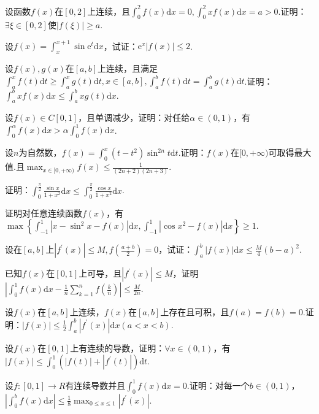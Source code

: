 \begin{xiti}
\item 设函数$f(x)$在$[0,2]$上连续，且$\int_{0}^{2} f(x) \mathrm{d} x=0, \int_{0}^{2} x f(x) \mathrm{d} x=a>0$.证明：$\exists \xi \in[0,2]$使$|f(\xi)| \geqslant a$.
\item 设$f(x)=\int_{x}^{x+1} \sin \mathrm{e}^{t} \mathrm{d} x$，试证：$\mathrm{e}^{x}|f(x)| \leqslant 2$.
\item 设$f(x),g(x)$在$[a,b]$上连续，且满足$\int_{a}^{x} f(t) \mathrm{d} t \geqslant \int_{a}^{x} g(t) \mathrm{d} t, x \in[a, b], \int_{a}^{b} f(t) \mathrm{d} t=\int_{a}^{b} g(t) \mathrm{d} t$.证明：$\int_{a}^{b} x f(x) \mathrm{d} x \leqslant \int_{a}^{b} x g(t) \mathrm{d} x$.
\item 设$f(x) \in C[0,1]$，且单调减少，证明：对任给$\alpha\in (0,1)$，有$\int_{0}^{\alpha} f(x) \mathrm{d} x>\alpha \int_{0}^{1} f(x) \mathrm{d} x$.
\item 设$n$为自然数，$f(x)=\int_{0}^{x}\left(t-t^{2}\right) \sin ^{2 n} t \mathrm{d} t$.证明：$f(x)$在$[0,+\infty)$可取得最大值.且$\max _{x \in[0,+\infty)} f(x) \leqslant \frac{1}{(2 n+2)(2 n+3)}$.
\item 证明：$\int_{0}^{\frac{\pi}{2}} \frac{\sin x}{1+x^{2}} \mathrm{d} x \leqslant \int_{0}^{\frac{\pi}{2}} \frac{\cos x}{1+x^{2}} \mathrm{d} x$.
\item 证明对任意连续函数$f(x)$，有$\max \left\{\int_{-1}^{1}\left|x-\sin ^{2} x-f(x)\right| \mathrm{d} x, \int_{-1}^{1}\left|\cos x^{2}-f(x)\right| \mathrm{d} x\right\} \geqslant 1$.
\item 设在$[a,b]$上$\left|f^{\prime}(x)\right| \leqslant M, f\left(\frac{a+b}{2}\right)=0$，试证：$\int_{a}^{b}|f(x)| \mathrm{d} x \leqslant \frac{M}{4}(b-a)^{2}$.
\item 已知$f(x)$在$[0,1]$上可导，且$\left|f^{\prime}(x)\right| \leqslant M$，证明$\left|\int_{0}^{1} f(x) \mathrm{d} x-\frac{1}{n} \sum_{k=1}^{n} f\left(\frac{k}{n}\right)\right| \leqslant \frac{M}{2 n}$.
\item 设$f(x)$在$[a,b]$上连续，$f(x)$在$[a,b]$上存在且可积，且$f(a)=f(b)=0$.证明：$|f(x)| \leqslant \frac{1}{2} \int_{a}^{b}\left|f^{\prime}(x)\right| \mathrm{d} x(a<x<b)$.
\item 设$f(x)$在$[0,1]$上有连续的导数，证明：$\forall x\in(0,1)$，有$|f(x)| \leqslant \int_{0}^{1}\left(|f(t)|+\left|f^{\prime}(t)\right|\right) \mathrm{d} t$.
\item 设$f :[0,1] \rightarrow R$有连续导数并且$\int_{0}^{1} f(x) \mathrm{d} x=0$.证明：对每一个$b\in (0,1)$，$\left|\int_{0}^{b} f(x) \mathrm{d} x\right| \leqslant \frac{1}{8} \max _{0 \leqslant x \leqslant 1}\left|f^{\prime}(x)\right|$.

\end{xiti}
